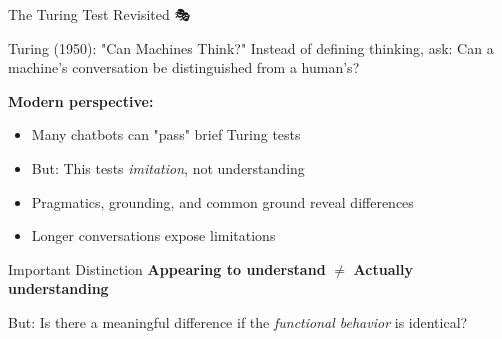 \documentclass[aspectratio=169]{beamer}
\begin{document}
\begin{frame}{The Turing Test Revisited 🎭}
\small
    \begin{block}{Turing (1950): "Can Machines Think?"}
        Instead of defining thinking, ask: Can a machine's conversation be distinguished from a human's?
    \end{block}

    \vspace{0.3cm}

    \textbf{Modern perspective:}
    \begin{itemize}\setlength{\itemsep}{0pt}
        \item Many chatbots can "pass" brief Turing tests
        \item But: This tests \textit{imitation}, not understanding
        \item Pragmatics, grounding, and common ground reveal differences
        \item Longer conversations expose limitations
    \end{itemize}

    \vspace{0.3cm}

    \begin{alertblock}{Important Distinction}
        \textbf{Appearing to understand} $\neq$ \textbf{Actually understanding}

        But: Is there a meaningful difference if the \textit{functional behavior} is identical?
    \end{alertblock}
\end{frame}
\end{document}
